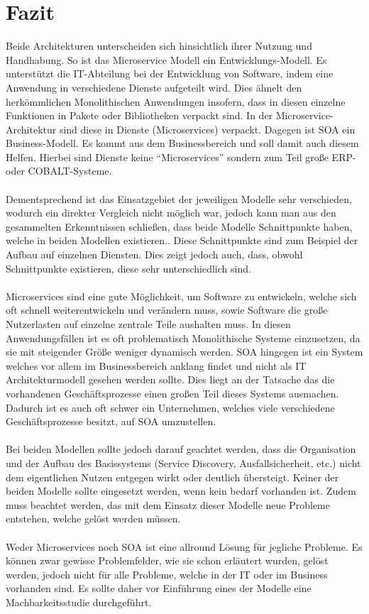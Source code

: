 \section{Fazit}
\label{sec:Fazit}
Beide Architekturen unterscheiden sich hinsichtlich ihrer Nutzung und Handhabung. So ist das Microservice Modell ein Entwicklungs-Modell. Es unterstützt die IT-Abteilung bei der Entwicklung von Software, indem eine Anwendung in verschiedene Dienste aufgeteilt wird. Dies ähnelt den herkömmlichen Monolithischen Anwendungen insofern, dass in diesen einzelne Funktionen in Pakete oder Bibliotheken verpackt sind. In der Microservice-Architektur sind diese in Dienste (Microservices) verpackt. Dagegen ist SOA ein Business-Modell. Es kommt aus dem Businessbereich und soll damit auch diesem Helfen. Hierbei sind Dienste keine "`Microservices"' sondern zum Teil große ERP- oder COBALT-Systeme.
\\\\
Dementsprechend ist das Einsatzgebiet der jeweiligen Modelle sehr verschieden, wodurch ein direkter Vergleich nicht möglich war, jedoch kann man aus den gesammelten Erkenntnissen schließen, dass beide Modelle  Schnittpunkte haben, welche in beiden Modellen existieren.. Diese Schnittpunkte sind zum Beispiel der Aufbau auf einzelnen Diensten. Dies zeigt jedoch auch, dass, obwohl Schnittpunkte existieren, diese sehr unterschiedlich sind.
\\\\
Microservices sind eine gute Möglichkeit, um Software zu entwickeln, welche sich oft schnell weiterentwickeln und verändern muss, sowie Software die große Nutzerlasten auf einzelne zentrale Teile aushalten muss. In diesen Anwendungsfällen ist es oft problematisch Monolithische Systeme einzusetzen, da sie mit steigender Größe weniger dynamisch werden.
SOA hingegen ist ein System welches vor allem im Businessbereich anklang findet und nicht als IT Architekturmodell gesehen werden sollte. Dies liegt an der Tatsache das die vorhandenen Geschäftsprozesse einen großen Teil dieses Systems ausmachen. Dadurch ist es auch oft schwer ein Unternehmen, welches viele verschiedene Geschäftsprozesse besitzt, auf SOA umzustellen.
\\\\
Bei beiden Modellen sollte jedoch darauf geachtet werden, dass die Organisation und der Aufbau des Basissystems (Service Discovery, Ausfallsicherheit, etc.) nicht dem eigentlichen Nutzen entgegen wirkt oder deutlich übersteigt. Keiner der beiden Modelle sollte eingesetzt werden, wenn kein bedarf vorhanden ist. Zudem muss beachtet werden, das mit dem Einsatz dieser Modelle neue Probleme entstehen, welche gelöst werden müssen.
\\\\
Weder Microservices noch SOA ist eine allround Lösung für jegliche Probleme. Es können zwar gewisse Problemfelder, wie sie schon erläutert wurden, gelöst werden, jedoch nicht für alle Probleme, welche in der IT oder im Business vorhanden sind. Es sollte daher vor Einführung eines der Modelle eine Machbarkeitsstudie durchgeführt.